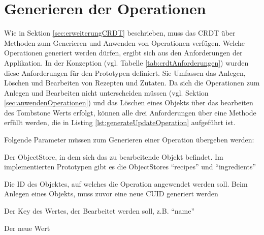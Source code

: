 \documentclass[a4paper, 12pt]{scrreprt}
\begin{document}
\begin{minipage}{\linewidth}
	
\end{minipage}

\begin{minipage}{\linewidth}
	
\end{minipage}

\section{Generieren der Operationen}

Wie in Sektion  \ref{sec:erweiterungCRDT} beschrieben, muss das CRDT über Methoden zum Generieren und Anwenden von Operationen verfügen. Welche Operationen generiert werden dürfen, ergibt sich aus den Anforderungen der Applikation. In der Konzeption (vgl. Tabelle \ref{tab:crdtAnforderungen}) wurden diese Anforderungen für den Prototypen definiert. Sie Umfassen das Anlegen, Löschen und Bearbeiten von Rezepten und Zutaten. Da sich die Operationen zum Anlegen und Bearbeiten nicht unterscheiden müssen (vgl. Sektion \ref{sec:anwendenOperationen}) und das Löschen eines Objekts über das bearbeiten des Tombstone Werts erfolgt, können alle drei Anforderungen über eine Methode erfüllt werden, die in Listing \ref{lst:generateUpdateOperation} aufgeführt ist. 

\begin{minipage}{\linewidth}
	
\end{minipage}

Folgende Parameter müssen zum Generieren einer Operation übergeben werden: 
\begin{description}[leftmargin=!,labelwidth=\widthof{\bfseries store: }]
	\item [\textit{store:} ] Der ObjectStore, in dem sich das zu bearbeitende Objekt befindet. Im implementierten Prototypen gibt es die ObjectStores \enquote{recipes} und \enquote{ingredients}
	\item [\textit{Id:} ] Die ID des Objektes, auf welches die Operation angewendet werden soll. Beim Anlegen eines Objekts, muss zuvor eine neue CUID generiert werden 
	\item [\textit{key:} ] Der Key des Wertes, der Bearbeitet werden soll, z.B. \enquote{name}
	\item [\textit{value:} ] Der neue Wert
\end{description}
\end{document}
